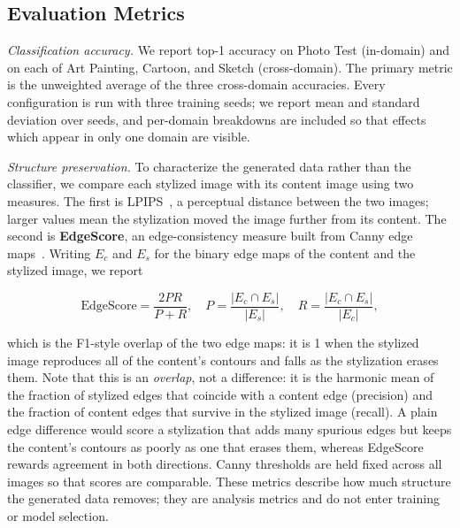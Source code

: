 \subsection{Evaluation Metrics}
\label{sec:evaluation_metrics}

\textit{Classification accuracy.} We report top-1 accuracy on Photo Test (in-domain) and on each of Art Painting, Cartoon, and Sketch (cross-domain). The primary metric is the unweighted average of the three cross-domain accuracies. Every configuration is run with three training seeds; we report mean and standard deviation over seeds, and per-domain breakdowns are included so that effects which appear in only one domain are visible.

\textit{Structure preservation.} To characterize the generated data rather than the classifier, we compare each stylized image with its content image using two measures. The first is LPIPS~\cite{zhang2018lpips}, a perceptual distance between the two images; larger values mean the stylization moved the image further from its content. The second is \textbf{EdgeScore}, an edge-consistency measure built from Canny edge maps~\cite{canny1986}. Writing $E_c$ and $E_s$ for the binary edge maps of the content and the stylized image, we report

\[
\text{EdgeScore} = \frac{2PR}{P+R}, \quad
P = \frac{|E_c \cap E_s|}{|E_s|}, \quad
R = \frac{|E_c \cap E_s|}{|E_c|},
\]

which is the F1-style overlap of the two edge maps: it is 1 when the stylized image reproduces all of the content's contours and falls as the stylization erases them. Note that this is an \textit{overlap}, not a difference: it is the harmonic mean of the fraction of stylized edges that coincide with a content edge (precision) and the fraction of content edges that survive in the stylized image (recall). A plain edge difference would score a stylization that adds many spurious edges but keeps the content's contours as poorly as one that erases them, whereas EdgeScore rewards agreement in both directions. Canny thresholds are held fixed across all images so that scores are comparable. These metrics describe how much structure the generated data removes; they are analysis metrics and do not enter training or model selection.
